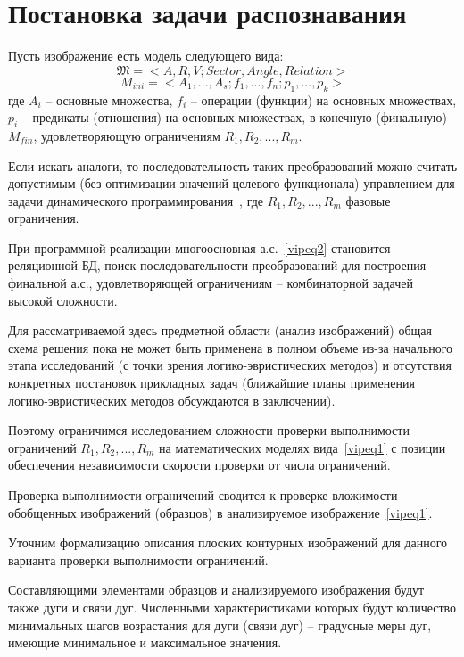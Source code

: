 \section{Постановка задачи распознавания }
Пусть изображение есть модель следующего вида:
\begin{equation}
\mathfrak{M} = < A, R, V; Sector, Angle, Relation >
\label{vipeq1}
\end{equation}
\begin{equation}
M_{ini} = <A_1,...,A_s;f_1,...,f_n;p_1,...,p_k>
\label{vipeq2}
\end{equation}
где $A_i$ -- основные множества, $f_i$ -- операции (функции) на основных множествах, $p_i$ -- предикаты (отношения) на основных множествах, в конечную (финальную) $M_{fin}$, удовлетворяющую ограничениям $R_1,R_2,...,R_m$.



Если искать аналоги, то последовательность таких преобразований можно считать допустимым (без оптимизации значений целевого функционала) управлением для задачи динамического программирования~\cite{D1}, где $R_1,R_2,...,R_m$ фазовые ограничения.

При программной реализации многоосновная а.с.~\ref{vipeq2} становится реляционной БД, поиск последовательности преобразований для построения финальной а.с., удовлетворяющей ограничениям – комбинаторной задачей высокой сложности.

Для рассматриваемой здесь предметной области (анализ изображений) общая схема решения пока не может быть применена в полном объеме из-за начального этапа исследований (с точки зрения логико-эвристических методов) и отсутствия конкретных постановок прикладных задач (ближайшие планы применения логико-эвристических методов обсуждаются в заключении).

Поэтому ограничимся исследованием сложности проверки выполнимости ограничений $R_1,R_2,...,R_m$ на математических моделях вида~\ref{vipeq1} с позиции обеспечения независимости скорости проверки от числа ограничений.

Проверка выполнимости ограничений сводится к проверке вложимости обобщенных изображений (образцов) в анализируемое изображение~\ref{vipeq1}. 

Уточним формализацию описания плоских контурных изображений для данного варианта проверки выполнимости ограничений.

Составляющими элементами образцов и анализируемого изображения будут также дуги и связи дуг. Численными характеристиками которых будут количество минимальных шагов возрастания для дуги (связи дуг) -- градусные меры дуг, имеющие минимальное и максимальное значения.

